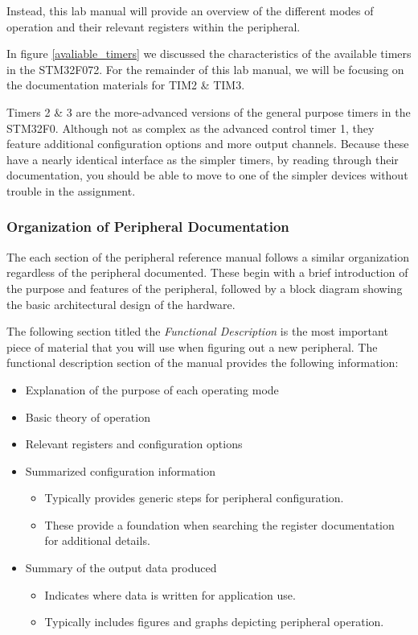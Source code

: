 \documentclass[11pt,fleqn]{book} %
\begin{document}
    Instead, this lab manual will provide an overview of the different modes of operation and their relevant registers within the peripheral.

    In figure \ref{avaliable_timers} we discussed the characteristics of the available timers in the STM32F072. For the remainder of this lab manual, we will be focusing on the documentation materials for TIM2 \& TIM3. 
    
    Timers 2 \& 3 are the more-advanced versions of the general purpose timers in the STM32F0. Although not as complex as the advanced control timer 1, they feature additional configuration options and more output channels. Because these have a nearly identical interface as the simpler timers, by reading through their documentation, you should be able to move to one of the simpler devices without trouble in the assignment. 
    
    \subsubsection{Organization of Peripheral Documentation}
    The each section of the peripheral reference manual follows a similar organization regardless of the peripheral documented. These begin with a brief introduction of the purpose and features of the peripheral, followed by a block diagram showing the basic architectural design of the hardware. 
    
    The following section titled the \textit{Functional Description} is the most important piece of material that you will use when figuring out a new peripheral. The functional description section of the manual provides the following information:
    
    \begin{itemize}
        \item Explanation of the purpose of each operating mode 
        \item Basic theory of operation 
        \item Relevant registers and configuration options 
        \item Summarized configuration information
        \begin{itemize}
            \item Typically provides generic steps for peripheral configuration. 
            \item These provide a foundation when searching the register documentation for additional details. 
        \end{itemize}
        \item Summary of the output data produced
        \begin{itemize}
            \item Indicates where data is written for application use.
            \item Typically includes figures and graphs depicting peripheral operation.
        \end{itemize}
    \end{itemize}
\end{document}
